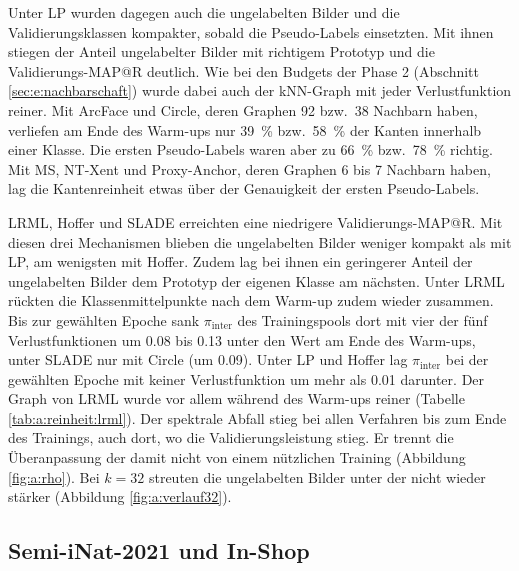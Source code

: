 Unter \ac{LP} wurden dagegen auch die ungelabelten Bilder und die Validierungsklassen kompakter, sobald die Pseudo-Labels einsetzten. Mit ihnen stiegen der Anteil ungelabelter Bilder mit richtigem Prototyp und die Validierungs-\ac{MAP@R} deutlich. Wie bei den Budgets der Phase 2 (Abschnitt \ref{sec:e:nachbarschaft}) wurde dabei auch der \ac{kNN}-Graph mit jeder Verlustfunktion reiner. Mit ArcFace und Circle, deren Graphen 92 bzw.\ 38 Nachbarn haben, verliefen am Ende des Warm-ups nur \qty{39}{\percent} bzw.\ \qty{58}{\percent} der Kanten innerhalb einer Klasse. Die ersten Pseudo-Labels waren aber zu \qty{66}{\percent} bzw.\ \qty{78}{\percent} richtig. Mit \ac{MS}, \ac{NT-Xent} und Proxy-Anchor, deren Graphen 6 bis 7 Nachbarn haben, lag die Kantenreinheit etwas über der Genauigkeit der ersten Pseudo-Labels.

\ac{LRML}, Hoffer und \ac{SLADE} erreichten eine niedrigere Validierungs-\ac{MAP@R}. Mit diesen drei Mechanismen blieben die ungelabelten Bilder weniger kompakt als mit \ac{LP}, am wenigsten mit Hoffer. Zudem lag bei ihnen ein geringerer Anteil der ungelabelten Bilder dem Prototyp der eigenen Klasse am nächsten. Unter \ac{LRML} rückten die Klassenmittelpunkte nach dem Warm-up zudem wieder zusammen. Bis zur gewählten Epoche sank $\pi_{\mathrm{inter}}$ des Trainingspools dort mit vier der fünf Verlustfunktionen um \num{0.08} bis \num{0.13} unter den Wert am Ende des Warm-ups, unter \ac{SLADE} nur mit Circle (um \num{0.09}). Unter \ac{LP} und Hoffer lag $\pi_{\mathrm{inter}}$ bei der gewählten Epoche mit keiner Verlustfunktion um mehr als \num{0.01} darunter. Der Graph von \ac{LRML} wurde vor allem während des Warm-ups reiner (Tabelle \ref{tab:a:reinheit:lrml}). Der spektrale Abfall stieg bei allen Verfahren bis zum Ende des Trainings, auch dort, wo die Validierungsleistung stieg. Er trennt die Überanpassung der \UEBL damit nicht von einem nützlichen Training (Abbildung \ref{fig:a:rho}). Bei $k=32$ streuten die ungelabelten Bilder unter der \UEBL nicht wieder stärker (Abbildung \ref{fig:a:verlauf32}).%

\subsection{Semi-iNat-2021 und In-Shop}
\label{sec:e:geo:weitere}

